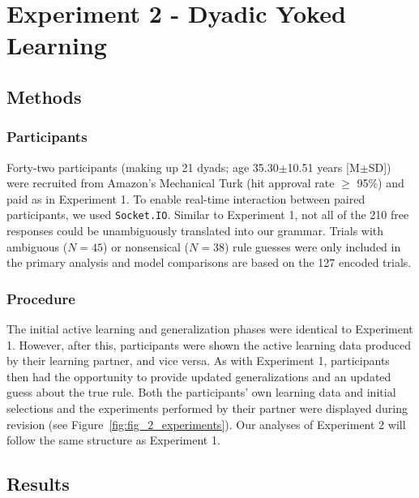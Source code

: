 \documentclass[doc,natbib,floatsintext]{apa7}
\begin{document}
\section{Experiment 2 - Dyadic Yoked Learning}
\subsection{Methods}
\subsubsection{Participants}
Forty-two participants (making up 21 dyads; age 35.30$\pm$10.51 years [M$\pm$SD]) were recruited from Amazon's Mechanical Turk (hit approval rate $\geq$ 95\%) and paid as in Experiment 1. To enable real-time interaction between paired participants, we used {\tt Socket.IO}. Similar to Experiment 1, not all of the 210 free responses could be unambiguously translated into our grammar.  %
Trials with ambiguous ($N=45$) or nonsensical ($N=38$) rule guesses were only included in the primary analysis and model comparisons are based on the 127 encoded trials. 

\subsubsection{Procedure}
The initial active learning and generalization phases were identical to Experiment 1. However, after this, participants were shown the active learning data produced by their learning partner, and vice versa. As with Experiment 1, participants then had the opportunity to provide updated generalizations and an updated guess about the true rule. Both the participants' own learning data and initial selections and the experiments performed by their partner were displayed during revision (see Figure~\ref{fig:fig_2_experiments}). Our analyses of Experiment 2 will follow the same structure as Experiment 1. 


\subsection{Results}
\end{document}
